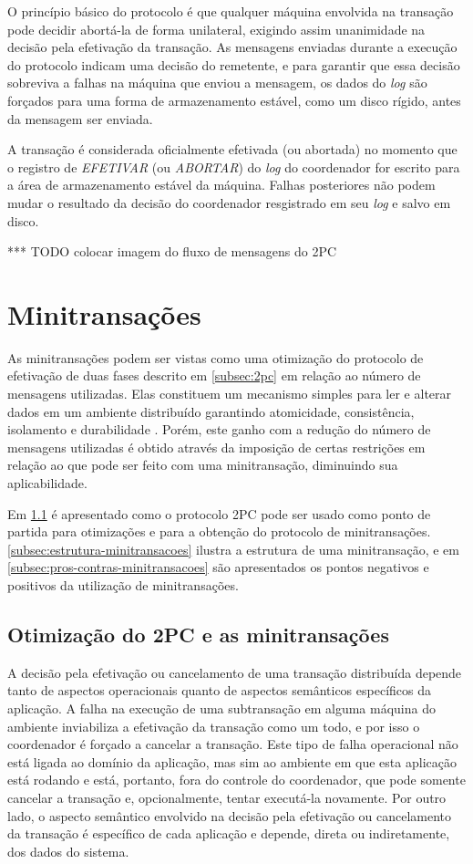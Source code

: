 \documentclass[11pt,twoside,a4paper]{book}
\begin{document}
O princípio básico do protocolo é que qualquer máquina envolvida na transação pode decidir abortá-la de forma unilateral, exigindo assim unanimidade na decisão pela efetivação da transação. As mensagens enviadas durante a execução do protocolo indicam uma decisão do remetente, e para garantir que essa decisão sobreviva a falhas na máquina que enviou a mensagem, os dados do \emph{log} são forçados para uma forma de armazenamento estável, como um disco rígido, antes da mensagem ser enviada.

A transação é considerada oficialmente efetivada (ou abortada) no momento que o registro de \emph{EFETIVAR} (ou \emph{ABORTAR}) do \emph{log} do coordenador for escrito para a área de armazenamento estável da máquina. Falhas posteriores não podem mudar o resultado da decisão do coordenador resgistrado em seu \emph{log} e salvo em disco.

*** TODO colocar imagem do fluxo de mensagens do 2PC

\section{Minitransações}
\label{sec:minitransacoes}
As minitransações podem ser vistas como uma otimização do protocolo de efetivação de duas fases descrito em \ref{subsec:2pc} em relação ao número de mensagens utilizadas. Elas constituem um mecanismo simples para ler e alterar dados em um ambiente distribuído garantindo atomicidade, consistência, isolamento e durabilidade \cite{sinfonia}. Porém, este ganho com a redução do número de mensagens utilizadas é obtido através da imposição de certas restrições em relação ao que pode ser feito com uma minitransação, diminuindo sua aplicabilidade.

Em \ref{subsec:derivando-minitransacoes} é apresentado como o protocolo 2PC pode ser usado como ponto de partida para otimizações e para a obtenção do protocolo de minitransações. \ref{subsec:estrutura-minitransacoes} ilustra a estrutura de uma minitransação, e em \ref{subsec:pros-contras-minitransacoes} são apresentados os pontos negativos e positivos da utilização de minitransações.

\subsection{Otimização do 2PC e as minitransações}
\label{subsec:derivando-minitransacoes}
A decisão pela efetivação ou cancelamento de uma transação distribuída depende tanto de aspectos operacionais quanto de aspectos semânticos específicos da aplicação. A falha na execução de uma subtransação em alguma máquina do ambiente inviabiliza a efetivação da transação como um todo, e por isso o coordenador é forçado a cancelar a transação. Este tipo de falha operacional não está ligada ao domínio da aplicação, mas sim ao ambiente em que esta aplicação está rodando e está, portanto, fora do controle do coordenador, que pode somente cancelar a transação e, opcionalmente, tentar executá-la novamente. Por outro lado, o aspecto semântico envolvido na decisão pela efetivação ou cancelamento da transação é específico de cada aplicação e depende, direta ou indiretamente, dos dados do sistema.
\end{document}
